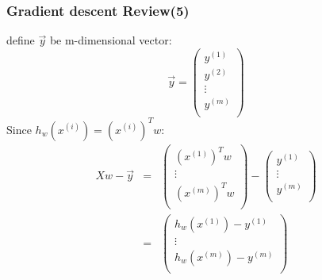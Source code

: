 \documentclass[slidestop,compress,mathserif]{beamer}
\begin{document}
    \begin{frame}
        \frametitle{Gradient descent Review(5)}
        define $\vec{y}$ be m-dimensional vector:
        $$\vec{y}=\left(
                               \begin{array}{c}
                                 y^{(1)} \\
                                 y^{(2)} \\
                                 \vdots \\
                                 y^{(m)} \\
                               \end{array}
                             \right)
        $$
        Since $h_w(x^{(i)})=(x^{(i)})^Tw$:
        \begin{eqnarray*}
            Xw-\vec{y} &=& \left(
                         \begin{array}{c}
                           (x^{(1)})^Tw \\
                           \vdots \\
                           (x^{(m)})^Tw \\
                         \end{array}
                       \right)
                       -
                       \left(
                         \begin{array}{c}
                           y^{(1)} \\
                           \vdots \\
                           y^{(m)} \\
                         \end{array}
                       \right)\\
                       &=& \left(
                             \begin{array}{c}
                               h_w(x^{(1)})-y^{(1)} \\
                               \vdots \\
                               h_w(x^{(m)})-y^{(m)} \\
                             \end{array}
                           \right)
        \end{eqnarray*}

    \end{frame}
\end{document}
